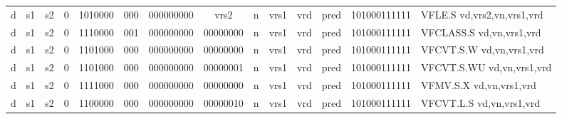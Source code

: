 \begin{landscape}
\begin{table}[p]
\begin{small}
\begin{center}
\begin{tabular}{p{0.08in}@{}p{0.08in}@{}p{0.08in}@{}p{0.08in}@{}p{0.50in}@{}p{0.30in}@{}p{0.08in}@{}p{0.8in}@{}p{0.48in}@{}p{0.32in}@{}p{0.08in}@{}p{0.8in}@{}p{0.8in}@{}p{0.4in}@{}p{0.56in}l}
\multicolumn{1}{|c|}{d} &
\multicolumn{1}{c|}{s1} &
\multicolumn{1}{c|}{s2} &
\multicolumn{1}{c|}{0} &
\multicolumn{1}{c|}{1010000} &
\multicolumn{1}{c|}{000} &
\multicolumn{2}{c|}{000000000} &
\multicolumn{2}{c|}{vrs2} &
\multicolumn{1}{c|}{n} &
\multicolumn{1}{c|}{vrs1} &
\multicolumn{1}{c|}{vrd} &
\multicolumn{1}{c|}{pred} &
\multicolumn{1}{c|}{101000111111} & VFLE.S vd,vrs2,vn,vrs1,vrd \\
\cline{1-15}
  

\multicolumn{1}{|c|}{d} &
\multicolumn{1}{c|}{s1} &
\multicolumn{1}{c|}{s2} &
\multicolumn{1}{c|}{0} &
\multicolumn{1}{c|}{1110000} &
\multicolumn{1}{c|}{001} &
\multicolumn{2}{c|}{000000000} &
\multicolumn{2}{c|}{00000000} &
\multicolumn{1}{c|}{n} &
\multicolumn{1}{c|}{vrs1} &
\multicolumn{1}{c|}{vrd} &
\multicolumn{1}{c|}{pred} &
\multicolumn{1}{c|}{101000111111} & VFCLASS.S vd,vn,vrs1,vrd \\
\cline{1-15}
  

\multicolumn{1}{|c|}{d} &
\multicolumn{1}{c|}{s1} &
\multicolumn{1}{c|}{s2} &
\multicolumn{1}{c|}{0} &
\multicolumn{1}{c|}{1101000} &
\multicolumn{1}{c|}{000} &
\multicolumn{2}{c|}{000000000} &
\multicolumn{2}{c|}{00000000} &
\multicolumn{1}{c|}{n} &
\multicolumn{1}{c|}{vrs1} &
\multicolumn{1}{c|}{vrd} &
\multicolumn{1}{c|}{pred} &
\multicolumn{1}{c|}{101000111111} & VFCVT.S.W vd,vn,vrs1,vrd \\
\cline{1-15}
  

\multicolumn{1}{|c|}{d} &
\multicolumn{1}{c|}{s1} &
\multicolumn{1}{c|}{s2} &
\multicolumn{1}{c|}{0} &
\multicolumn{1}{c|}{1101000} &
\multicolumn{1}{c|}{000} &
\multicolumn{2}{c|}{000000000} &
\multicolumn{2}{c|}{00000001} &
\multicolumn{1}{c|}{n} &
\multicolumn{1}{c|}{vrs1} &
\multicolumn{1}{c|}{vrd} &
\multicolumn{1}{c|}{pred} &
\multicolumn{1}{c|}{101000111111} & VFCVT.S.WU vd,vn,vrs1,vrd \\
\cline{1-15}
  

\multicolumn{1}{|c|}{d} &
\multicolumn{1}{c|}{s1} &
\multicolumn{1}{c|}{s2} &
\multicolumn{1}{c|}{0} &
\multicolumn{1}{c|}{1111000} &
\multicolumn{1}{c|}{000} &
\multicolumn{2}{c|}{000000000} &
\multicolumn{2}{c|}{00000000} &
\multicolumn{1}{c|}{n} &
\multicolumn{1}{c|}{vrs1} &
\multicolumn{1}{c|}{vrd} &
\multicolumn{1}{c|}{pred} &
\multicolumn{1}{c|}{101000111111} & VFMV.S.X vd,vn,vrs1,vrd \\
\cline{1-15}
  

\multicolumn{1}{|c|}{d} &
\multicolumn{1}{c|}{s1} &
\multicolumn{1}{c|}{s2} &
\multicolumn{1}{c|}{0} &
\multicolumn{1}{c|}{1100000} &
\multicolumn{1}{c|}{000} &
\multicolumn{2}{c|}{000000000} &
\multicolumn{2}{c|}{00000010} &
\multicolumn{1}{c|}{n} &
\multicolumn{1}{c|}{vrs1} &
\multicolumn{1}{c|}{vrd} &
\multicolumn{1}{c|}{pred} &
\multicolumn{1}{c|}{101000111111} & VFCVT.L.S vd,vn,vrs1,vrd \\
\cline{1-15}
  


\end{tabular}
\end{center}
\end{small}
\end{table}
\end{landscape}
